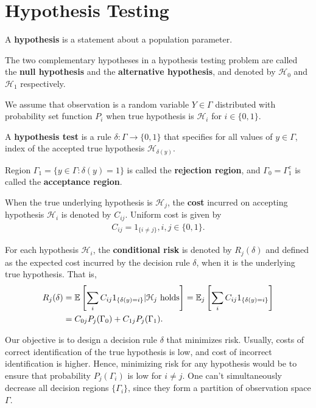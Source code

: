 \documentclass[a4paper,english,12pt]{article}
\begin{document}
\section{Hypothesis Testing}
\begin{defn} A \textbf{hypothesis} is a statement about a population parameter.
\end{defn}
\begin{defn} The two complementary hypotheses in a hypothesis testing problem are called the \textbf{null hypothesis} and the \textbf{alternative hypothesis}, and denoted by $\mathcal{H}_0$ and $\mathcal{H}_1$ respectively.
\end{defn}
We assume that observation is a random variable $Y \in \Gamma$ distributed with probability set function $P_i$ when true hypothesis is $\mathcal{H}_i$ for $i \in \{0,1\}$.
\begin{defn} A \textbf{hypothesis test} is a rule $\delta: \Gamma \to \{0,1\}$ that specifies for all values of $y \in \Gamma$, index of the accepted true hypothesis $\mathcal{H}_{\delta(y)}$. 
\end{defn}
\begin{defn}
Region $\Gamma_1 = \{ y \in \Gamma: \delta(y) = 1 \}$ is called the \textbf{rejection region}, and $\Gamma_0 = \Gamma_1^c$ is called the \textbf{acceptance region}.
\end{defn}
\begin{defn} When the true underlying hypothesis is $\mathcal{H}_j$, the \textbf{cost} incurred on accepting hypothesis $\mathcal{H}_{i}$ is denoted by $C_{ij}$. Uniform cost is given by
\begin{align*}
C_{ij} = 1_{\{i \neq j\}}, i,j \in \{0,1\}.
\end{align*}
\end{defn}
\begin{defn} For each hypothesis $\mathcal{H}_i$, the \textbf{conditional risk} is denoted by $R_j(\delta)$ and defined as the expected cost incurred by the decision rule $\delta$, when it is the underlying true hypothesis. That is,
\begin{align*}
R_j(\delta) &= \mathbb{E}\left[ \sum_{i}C_{ij}1_{\{\delta(y) = i\}} | \mathcal{H}_j \text{ holds}\right] = \mathbb{E}_j\left[\sum_{i}C_{ij}1_{\{\delta(y) = i\}}\right]\\
&= C_{0j}P_j(\Gamma_0) + C_{1j}P_j(\Gamma_1).
\end{align*}
\end{defn}
Our objective is to design a decision rule $\delta$ that minimizes risk. Usually, costs of correct identification of the true hypothesis is low, and cost of incorrect identification is higher. Hence, minimizing risk for any hypothesis would be to ensure that probability $P_j(\Gamma_i)$ is low for $i \neq j$. One can't simultaneously decrease all decision regions $\{\Gamma_i \}$, since they form a partition of observation space $\Gamma$. 
\end{document}

